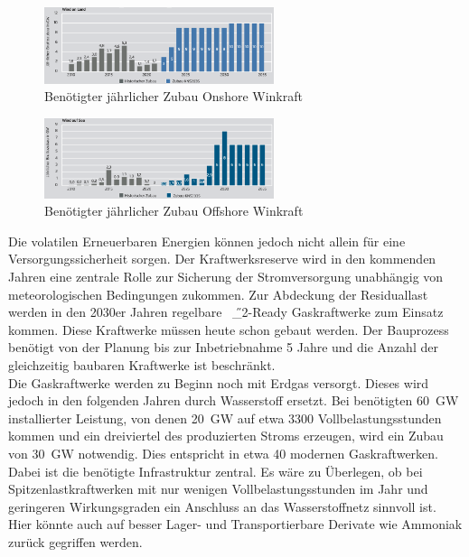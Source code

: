 				\begin{figure}[H]
				\centering
				\includegraphics[page=1, clip, width=0.6\textwidth]{./anhang/Zubau Onshore Agora2035.png}
				\caption{Benötigter jährlicher Zubau Onshore Winkraft}
				\label{Abb.Zubau Onshore Agora2035}
			\end{figure}
		
				\begin{figure}[H]
				\centering
				\includegraphics[page=1, clip, width=0.6\textwidth]{./anhang/Zubau Offshore Agora2035.png}
				\caption{Benötigter jährlicher Zubau Offshore Winkraft}
				\label{Abb.Zubau Offshore Agora2035}
			\end{figure}
		Die volatilen Erneuerbaren Energien können jedoch nicht allein für eine Versorgungssicherheit sorgen. Der Kraftwerksreserve wird in den kommenden Jahren eine zentrale Rolle zur Sicherung der Stromversorgung unabhängig von meteorologischen Bedingungen zukommen. Zur Abdeckung der Residuallast werden in den 2030er Jahren regelbare \SI{}{\H{_2}}-Ready Gaskraftwerke zum Einsatz kommen. Diese Kraftwerke müssen heute schon gebaut werden. Der Bauprozess benötigt von der Planung bis zur Inbetriebnahme 5 Jahre und die Anzahl der gleichzeitig baubaren Kraftwerke ist beschränkt.\\
		Die Gaskraftwerke werden zu Beginn noch mit Erdgas versorgt. Dieses wird jedoch in den folgenden Jahren durch Wasserstoff ersetzt. Bei benötigten \SI{60}{\giga \watt} installierter Leistung, von denen \SI{20}{\giga \watt} auf etwa 3300 Vollbelastungsstunden kommen und ein dreiviertel des produzierten Stroms erzeugen, wird ein Zubau von \SI{30}{\giga \watt} notwendig. Dies entspricht in etwa 40 modernen Gaskraftwerken. Dabei ist die benötigte Infrastruktur zentral. Es wäre zu Überlegen, ob bei Spitzenlastkraftwerken mit nur wenigen Vollbelastungsstunden im Jahr und geringeren Wirkungsgraden ein Anschluss an das Wasserstoffnetz sinnvoll ist. Hier könnte auch auf besser Lager- und Transportierbare Derivate wie Ammoniak zurück gegriffen werden.\\
		
